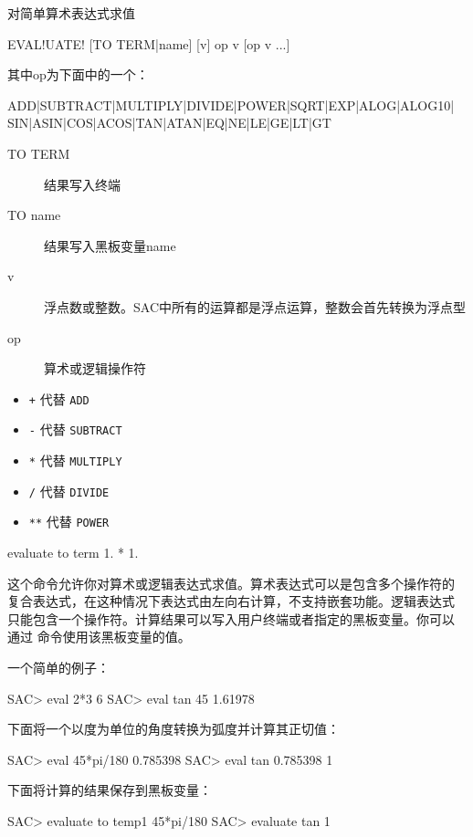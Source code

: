 \label{cmd:evaluate}

对简单算术表达式求值

\begin{SACSTX}
EVAL!UATE! [TO TERM|name] [v] op v [op v ...]
\end{SACSTX}
其中op为下面中的一个：
\begin{SACSTX}
ADD|SUBTRACT|MULTIPLY|DIVIDE|POWER|SQRT|EXP|ALOG|ALOG10|
SIN|ASIN|COS|ACOS|TAN|ATAN|EQ|NE|LE|GE|LT|GT
\end{SACSTX}

\begin{description}
\item [TO TERM] 结果写入终端
\item [TO name] 结果写入黑板变量name
\item [v] 浮点数或整数。SAC中所有的运算都是浮点运算，整数会首先转换为浮点型
\item [op] 算术或逻辑操作符
\end{description}

\begin{itemize}
\item \texttt{+} 代替 \texttt{ADD}
\item \texttt{-} 代替 \texttt{SUBTRACT}
\item \texttt{*} 代替 \texttt{MULTIPLY}
\item \texttt{/} 代替 \texttt{DIVIDE}
\item \texttt{**} 代替 \texttt{POWER}
\end{itemize}

\begin{SACDFT}
evaluate to term 1. * 1.
\end{SACDFT}

这个命令允许你对算术或逻辑表达式求值。算术表达式可以是包含多个操作符的
复合表达式，在这种情况下表达式由左向右计算，不支持嵌套功能。逻辑表达式
只能包含一个操作符。计算结果可以写入用户终端或者指定的黑板变量。你可以
通过  命令使用该黑板变量的值。

一个简单的例子：
\begin{SACCode}
SAC> eval 2*3
 6
SAC> eval tan 45
1.61978
\end{SACCode}

下面将一个以度为单位的角度转换为弧度并计算其正切值：
\begin{SACCode}
SAC> eval 45*pi/180
 0.785398
SAC> eval tan 0.785398
 1
\end{SACCode}

下面将计算的结果保存到黑板变量：
\begin{SACCode}
SAC> evaluate to temp1 45*pi/180
SAC> evaluate tan %
 1
\end{SACCode}

